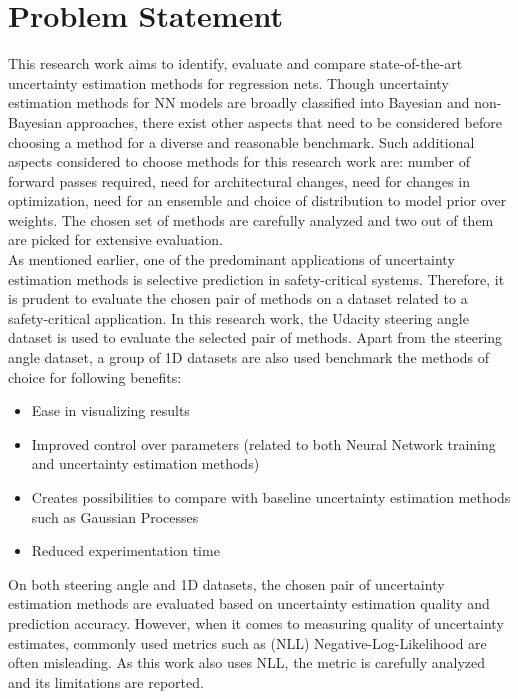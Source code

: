     \section{Problem Statement}
    This research work aims to identify, evaluate and compare state-of-the-art uncertainty estimation methods for regression nets. Though uncertainty estimation methods for NN models are broadly classified into Bayesian and non-Bayesian approaches, there exist other aspects that need to be considered before choosing a method for a diverse and reasonable benchmark. Such additional aspects considered to choose methods for this research work are: number of forward passes required, need for architectural changes, need for changes in optimization, need for an ensemble and choice of distribution to model prior over weights. The chosen set of methods are carefully analyzed and two out of them are picked for extensive evaluation.\\
    As mentioned earlier, one of the predominant applications of uncertainty estimation methods is selective prediction in safety-critical systems. Therefore, it is prudent to evaluate the chosen pair of methods on a dataset related to a safety-critical application. In this research work, the Udacity steering angle dataset\cite{udasteer} is used to evaluate the selected pair of methods. Apart from the steering angle dataset, a group of 1D datasets are also used benchmark the methods of choice for following benefits:
    \begin{itemize}
    	
    	\item Ease in visualizing results
    	\item Improved control over parameters (related to both Neural Network training and uncertainty estimation methods)
    	\item Creates possibilities to compare with baseline uncertainty estimation methods such as Gaussian Processes
    	\item Reduced experimentation time
    \end{itemize}
	On both steering angle and 1D datasets, the chosen pair of uncertainty estimation methods are evaluated based on uncertainty estimation quality and prediction accuracy. However, when it comes to measuring quality of uncertainty estimates, commonly used metrics such as (NLL) Negative-Log-Likelihood are often misleading\cite{yao2019quality}. As this work also uses NLL, the metric is carefully analyzed and its limitations are reported.
	
